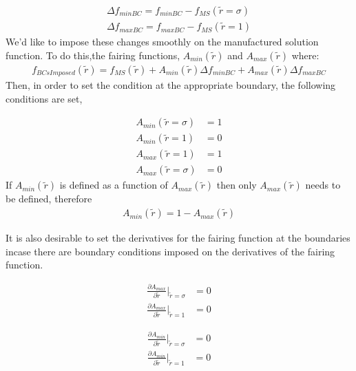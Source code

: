 \begin{align*}
    \Delta f_{minBC} = f_{minBC} - f_{MS}(\widetilde{r} = \sigma)\\
    \Delta f_{maxBC} = f_{maxBC} - f_{MS}(\widetilde{r} = 1) 
\end{align*}
We'd like to impose these changes smoothly on the manufactured solution function.
To do this,the fairing functions, $A_{min}(\widetilde{r})$ and $A_{max}(\widetilde{r})$
where:
\begin{align*}
    f_{BCsImposed}(\widetilde{r}) = f_{MS}(\widetilde{r}) +
    A_{min}(\widetilde{r}) \Delta f_{minBC}  +  
    A_{max}(\widetilde{r}) \Delta f_{maxBC}  
\end{align*}
Then, in order to set the condition at the appropriate boundary, the following 
conditions are set,


\begin{align*}
    A_{min}(\widetilde{r} = \sigma) &= 1\\
    A_{min}(\widetilde{r} = 1) &= 0 \\
    A_{max}(\widetilde{r} = 1) &= 1 \\
    A_{max}(\widetilde{r} = \sigma) &= 0 
\end{align*}
If $A_{min}(\widetilde{r})$ is defined as a function of $A_{max}(\widetilde{r})$
then only $A_{max}(\widetilde{r})$ needs to be defined, therefore 
\begin{align*}
    A_{min}(\widetilde{r}) = 1 - A_{max}(\widetilde{r}) 
\end{align*}

It is also desirable to set the derivatives for the fairing function at the 
boundaries incase there are boundary conditions imposed on the derivatives of 
the fairing function.

\begin{align*}
    \frac{\partial A_{max}}{\partial \widetilde{r}}|_{\widetilde{r}= \sigma} &= 0\\
    \frac{\partial A_{max}}{\partial \widetilde{r}}|_{\widetilde{r}= 1} &= 0    
\end{align*}

\begin{align*}
    \frac{\partial A_{min}}{\partial \widetilde{r}}|_{\widetilde{r}= \sigma} &= 0\\
    \frac{\partial A_{min}}{\partial \widetilde{r}}|_{\widetilde{r}= 1} &= 0    
\end{align*}

